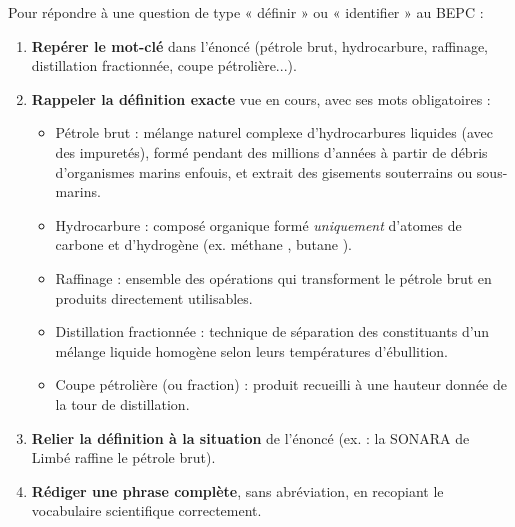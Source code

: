 \documentclass[11pt]{article}
\newcommand{\cle}[1]{{\popxbold\color{popdark}#1}}
\begin{document}
\begin{methode}
Pour répondre à une question de type « définir » ou « identifier » au BEPC :
\begin{enumerate}
\item \textbf{Repérer le mot-clé} dans l'énoncé (pétrole brut, hydrocarbure, raffinage, distillation fractionnée, coupe pétrolière...).
\item \textbf{Rappeler la définition exacte} vue en cours, avec ses mots obligatoires :
\begin{itemize}
\item \cle{Pétrole brut} : mélange naturel complexe d'hydrocarbures liquides (avec des impuretés), formé pendant des millions d'années à partir de débris d'organismes marins enfouis, et extrait des gisements souterrains ou sous-marins.
\item \cle{Hydrocarbure} : composé organique formé \emph{uniquement} d'atomes de carbone et d'hydrogène (ex. méthane , butane ).
\item \cle{Raffinage} : ensemble des opérations qui transforment le pétrole brut en produits directement utilisables.
\item \cle{Distillation fractionnée} : technique de séparation des constituants d'un mélange liquide homogène selon leurs températures d'ébullition.
\item \cle{Coupe pétrolière} (ou fraction) : produit recueilli à une hauteur donnée de la tour de distillation.
\end{itemize}
\item \textbf{Relier la définition à la situation} de l'énoncé (ex. : la SONARA de Limbé raffine le pétrole brut).
\item \textbf{Rédiger une phrase complète}, sans abréviation, en recopiant le vocabulaire scientifique correctement.
\end{enumerate}
\end{methode}
\end{document}
